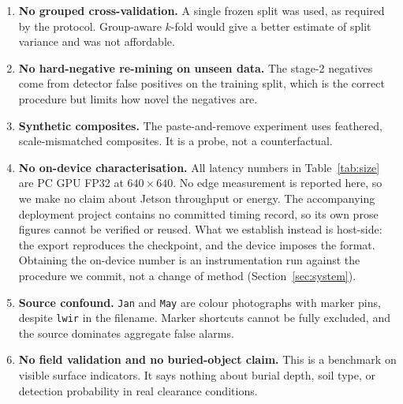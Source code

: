 \begin{enumerate}[leftmargin=1.4em,itemsep=2pt]
corrected labels because no training-label errors were found.
\item \textbf{No grouped cross-validation.} A single frozen split was used, as
required by the protocol. Group-aware $k$-fold would give a better estimate of
split variance and was not affordable.
\item \textbf{No hard-negative re-mining on unseen data.} The stage-2 negatives
come from detector false positives on the training split, which is the correct
procedure but limits how novel the negatives are.
\item \textbf{Synthetic composites.} The paste-and-remove experiment uses
feathered, scale-mismatched composites. It is a probe, not a counterfactual.
\item \textbf{No on-device characterisation.} All latency numbers in
Table~\ref{tab:size} are PC GPU FP32 at $640\times640$. No edge measurement is
reported here, so we make no claim about Jetson throughput or energy. The
accompanying deployment project contains no committed timing record, so its own
prose figures cannot be verified or reused. What we establish instead is
host-side: the export reproduces the checkpoint, and the device imposes the
format. Obtaining the on-device number is an instrumentation run against the
procedure we commit, not a change of method
(Section~\ref{sec:system}).
\item \textbf{Source confound.} \texttt{Jan} and \texttt{May} are colour
photographs with marker pins, despite \texttt{lwir} in the filename. Marker
shortcuts cannot be fully excluded, and the source dominates aggregate false
alarms.
\item \textbf{No field validation and no buried-object claim.} This is a
benchmark on visible surface indicators. It says nothing about burial depth,
soil type, or detection probability in real clearance conditions.
\end{enumerate}
